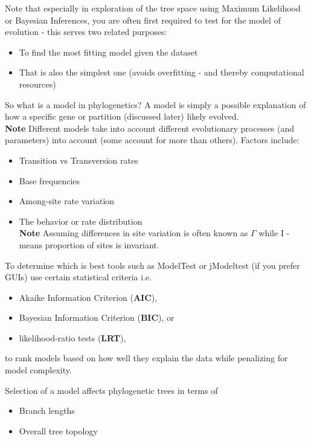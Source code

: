 \documentclass[11pt]{report}
\begin{document}
{\begin{tcolorbox}[label=box:modeltesting, colback=gray!10!white, coltitle=white, colframe=gray!80!black, title=Model Testing in Phylogenetics, breakable]
	Note that especially in exploration of the tree space using Maximum Likelihood or Bayesian Inferences, you are often first required to test for the model of evolution - this serves two related purposes:
	\begin{itemize}
		\item To find the most fitting model given the dataset
		\item That is also the simplest one (avoids overfitting - and thereby computational resources)
	\end{itemize}
	
	So what is a model in phylogenetics? A model is simply a possible explanation of how a specific gene or partition (discussed later) likely evolved. \\
	\textbf{Note} Different models take into account different evolutionary processes (and parameters) into account (some account for more than others). Factors include:
	\begin{itemize}
		\item Transition vs Transversion rates
		\item Base frequencies
		\item Among-site rate variation
		\item The behavior or rate distribution \\ \textbf{Note} Assuming differences in site variation is often known as $\Gamma$ while I - means proportion of sites is invariant.
	\end{itemize}
		
	To determine which is best tools such as ModelTest or jModeltest (if you prefer GUIs) use certain statistical criteria i.e.
	\begin{itemize}
		\item Akaike Information Criterion (\textbf{AIC}),
		\item Bayesian Information Criterion (\textbf{BIC}), or
		\item likelihood-ratio tests (\textbf{LRT}), 
	\end{itemize}
	
	to rank models based on how well they explain the data while penalizing for model complexity.
	
Selection of a model affects phylogenetic trees in terms of 
\begin{itemize}
	\item Branch lengths 
	\item Overall tree topology 
\end{itemize}


\end{tcolorbox}}
\end{document}
